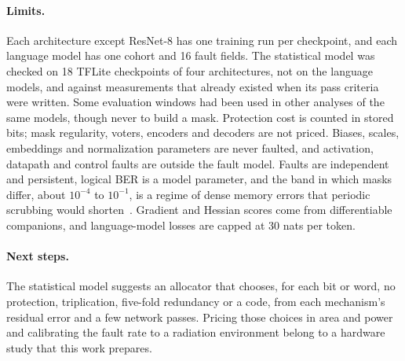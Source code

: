 \paragraph{Limits.} Each architecture except ResNet-8 has one training run per checkpoint, and each language model has one cohort and 16 fault fields. The statistical model was checked on 18 TFLite checkpoints of four architectures, not on the language models, and against measurements that already existed when its pass criteria were written. Some evaluation windows had been used in other analyses of the same models, though never to build a mask. Protection cost is counted in stored bits; mask regularity, voters, encoders and decoders are not priced. Biases, scales, embeddings and normalization parameters are never faulted, and activation, datapath and control faults are outside the fault model. Faults are independent and persistent, logical BER is a model parameter, and the band in which masks differ, about $10^{-4}$ to $10^{-1}$, is a regime of dense memory errors that periodic scrubbing would shorten~\cite{biswas2005avf}. Gradient and Hessian scores come from differentiable companions, and language-model losses are capped at 30 nats per token.

\paragraph{Next steps.} The statistical model suggests an allocator that chooses, for each bit or word, no protection, triplication, five-fold redundancy or a code, from each mechanism's residual error and a few network passes. Pricing those choices in area and power and calibrating the fault rate to a radiation environment belong to a hardware study that this work prepares.

